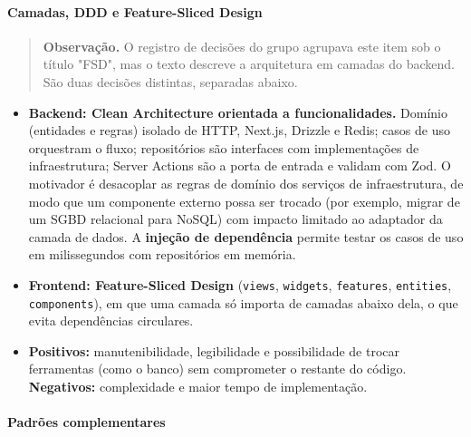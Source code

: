 \documentclass[
  brazilian,
  11pt,
]{article}
\providecommand{\tightlist}{%
  \setlength{\itemsep}{0pt}\setlength{\parskip}{0pt}}
\begin{document}
\paragraph{Camadas, DDD e Feature-Sliced Design}\label{camadas-ddd-e-feature-sliced-design}

\begin{quote}
\textbf{Observação.} O registro de decisões do grupo agrupava este item sob o título "FSD", mas o texto descreve a arquitetura em camadas do backend. São duas decisões distintas, separadas abaixo.
\end{quote}

\begin{itemize}
\tightlist
\item
  \textbf{Backend: Clean Architecture orientada a funcionalidades.} Domínio (entidades e regras) isolado de HTTP, Next.js, Drizzle e Redis; casos de uso orquestram o fluxo; repositórios são interfaces com implementações de infraestrutura; Server Actions são a porta de entrada e validam com Zod. O motivador é desacoplar as regras de domínio dos serviços de infraestrutura, de modo que um componente externo possa ser trocado (por exemplo, migrar de um SGBD relacional para NoSQL) com impacto limitado ao adaptador da camada de dados. A \textbf{injeção de dependência} permite testar os casos de uso em milissegundos com repositórios em memória.
\item
  \textbf{Frontend: Feature-Sliced Design} (\texttt{views}, \texttt{widgets}, \texttt{features}, \texttt{entities}, \texttt{components}), em que uma camada só importa de camadas abaixo dela, o que evita dependências circulares.
\item
  \textbf{Positivos:} manutenibilidade, legibilidade e possibilidade de trocar ferramentas (como o banco) sem comprometer o restante do código. \textbf{Negativos:} complexidade e maior tempo de implementação.
\end{itemize}

\paragraph{Padrões complementares}\label{padruxf5es-complementares}
\end{document}
